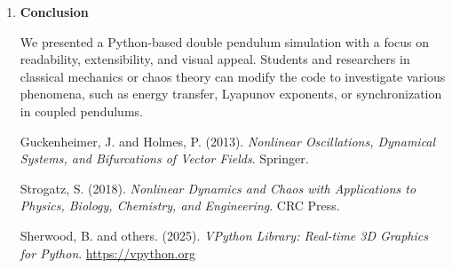 \documentclass[letterpaper,12pt]{article}
\begin{document}
\begin{enumerate}[leftmargin=*, itemsep=1em]
\item \textbf{Conclusion}

We presented a Python-based double pendulum simulation with a focus on readability, extensibility, and visual appeal. Students and researchers in classical mechanics or chaos theory can modify the code to investigate various phenomena, such as energy transfer, Lyapunov exponents, or synchronization in coupled pendulums.



\begin{thebibliography}{00}

Guckenheimer, J. and Holmes, P. (2013). \textit{Nonlinear Oscillations, Dynamical Systems, and Bifurcations of Vector Fields}. Springer.

Strogatz, S. (2018). \textit{Nonlinear Dynamics and Chaos with Applications to Physics, Biology, Chemistry, and Engineering}. CRC Press.

Sherwood, B. and others. (2025). \textit{VPython Library: Real-time 3D Graphics for Python}. \url{https://vpython.org}

\end{thebibliography}

\end{enumerate}

\thispagestyle{ack_footer}
\end{document}

